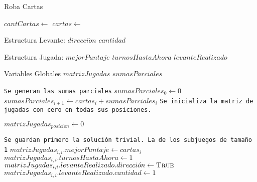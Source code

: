\documentclass[11pt, a4paper, twoside]{article}
\begin{document}
\begin{algorithm}[H]
\caption{Roba Cartas}
\footnotesize\begin{algorithmic}[1]
  \Require
    \Statex $cantCartas \gets$  
    \Statex $cartas \gets$  
    
  \Ensure
    \Statex {} 
    \Statex {} 
    \Statex {} 
    \Statex {}     
	\Statex
	
	\Statex Estructura Levante:
	\Statex \hspace{0.15cm} $direcci \acute{o}n$ 	
	\Statex \hspace{0.15cm} $cantidad$				
	
	\Statex
	
	\Statex Estructura Jugada:
	\Statex \hspace{0.15cm} $mejorPuntaje$			
	\Statex \hspace{0.15cm} $turnosHastaAhora$		
	\Statex \hspace{0.15cm} $levanteRealizado$		

	\Statex 
	\Statex Variables Globales
	\Statex \hspace{0.15cm} $matrizJugadas$			
	\Statex \hspace{0.15cm} $sumasParciales$		
	
	\Statex
	\Statex	
	
	\Statex \texttt{Se generan las sumas parciales}
	\State $sumasParciales_0 \gets 0$ 										
										
		\State $sumasParciales_{i+1} \gets cartas_i + sumasParciales_{i}$	
	\EndFor
	\Statex
	\Statex \texttt{Se inicializa la matriz de jugadas con cero en todas sus posiciones.}
	
					
		\State $matrizJugadas_{posici \acute{o}n} \gets 0$					
	\EndFor
	
	\Statex
	\Statex \texttt{Se guardan primero la solución trivial. La de los subjuegos de tamaño 1}
								
		\State $matrizJugadas_{i,i}.mejorPuntaje \gets cartas_i$			
		\State $matrizJugadas_{i,i}.turnosHastaAhora \gets 1$				
		\State $matrizJugadas_{i,i}.levanteRealizado.direcci \acute{o}n \gets \Call{True}{}$ 
		\State $matrizJugadas_{i,i}.levanteRealizado.cantidad \gets 1$ 		
	\EndFor


\end{algorithmic}
\end{algorithm}
\end{document}
